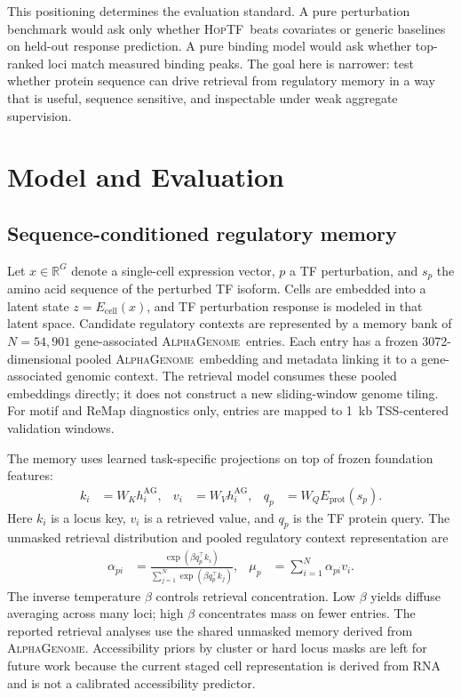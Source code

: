 \documentclass{article}
\newcommand{\hoptf}{\textsc{HopTF}}
\newcommand{\ag}{\textsc{AlphaGenome}}
\begin{document}
This positioning determines the evaluation standard. A pure perturbation benchmark would ask only whether \hoptf\ beats covariates or generic baselines on held-out response prediction. A pure binding model would ask whether top-ranked loci match measured binding peaks. The goal here is narrower: test whether protein sequence can drive retrieval from regulatory memory in a way that is useful, sequence sensitive, and inspectable under weak aggregate supervision.

\section{Model and Evaluation}

\subsection{Sequence-conditioned regulatory memory}

Let \(x \in \mathbb{R}^G\) denote a single-cell expression vector, \(p\) a TF perturbation, and \(s_p\) the amino acid sequence of the perturbed TF isoform. Cells are embedded into a latent state \(z=E_{\mathrm{cell}}(x)\), and TF perturbation response is modeled in that latent space. Candidate regulatory contexts are represented by a memory bank of \(N=54{,}901\) gene-associated \ag\ entries. Each entry has a frozen 3072-dimensional pooled \ag\ embedding and metadata linking it to a gene-associated genomic context. The retrieval model consumes these pooled embeddings directly; it does not construct a new sliding-window genome tiling. For motif and ReMap diagnostics only, entries are mapped to 1~kb TSS-centered validation windows.

The memory uses learned task-specific projections on top of frozen foundation features:
\begin{align}
    k_i &= W_K h_i^{\mathrm{AG}}, &
    v_i &= W_V h_i^{\mathrm{AG}}, &
    q_p &= W_Q E_{\mathrm{prot}}(s_p).
\end{align}
Here \(k_i\) is a locus key, \(v_i\) is a retrieved value, and \(q_p\) is the TF protein query. The unmasked retrieval distribution and pooled regulatory context representation are
\begin{align}
    \alpha_{pi} &= \frac{\exp(\beta q_p^\top k_i)}{\sum_{j=1}^N \exp(\beta q_p^\top k_j)}, &
    \mu_p &= \sum_{i=1}^N \alpha_{pi}v_i.
\end{align}
The inverse temperature \(\beta\) controls retrieval concentration. Low \(\beta\) yields diffuse averaging across many loci; high \(\beta\) concentrates mass on fewer entries. The reported retrieval analyses use the shared unmasked memory derived from \ag. Accessibility priors by cluster or hard locus masks are left for future work because the current staged cell representation is derived from RNA and is not a calibrated accessibility predictor.
\end{document}
